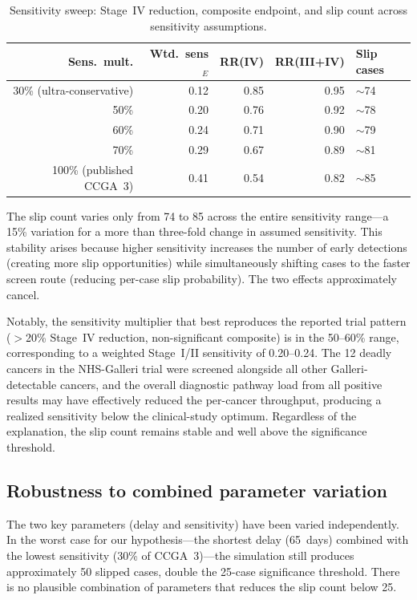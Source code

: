 \documentclass[11pt,letter]{article}
\begin{document}
\begin{table}[!ht]\centering
\caption{Sensitivity sweep: Stage~IV reduction, composite endpoint, and
slip count across sensitivity assumptions.}
\label{tab:sens_sweep}
\begin{tabular}{rrrrl}\toprule
Sens.\ mult. & Wtd.\ sens$_E$ & RR(IV) & RR(III+IV) & Slip cases \\ \midrule
30\% (ultra-conservative) & 0.12 & 0.85 & 0.95 & ${\sim}$74 \\
50\% & 0.20 & 0.76 & 0.92 & ${\sim}$78 \\
60\% & 0.24 & 0.71 & 0.90 & ${\sim}$79 \\
70\% & 0.29 & 0.67 & 0.89 & ${\sim}$81 \\
100\% (published CCGA~3) & 0.41 & 0.54 & 0.82 & ${\sim}$85 \\
\bottomrule
\end{tabular}
\end{table}

\noindent The slip count varies only from 74 to 85 across the entire
sensitivity range---a 15\% variation for a more than three-fold change in
assumed sensitivity. This stability arises because higher sensitivity
increases the number of early detections (creating more slip opportunities)
while simultaneously shifting cases to the faster screen route (reducing
per-case slip probability). The two effects approximately cancel.

Notably, the sensitivity multiplier that best reproduces the reported
trial pattern ($>$20\% Stage~IV reduction, non-significant composite) is
in the 50--60\% range, corresponding to a weighted Stage~I/II sensitivity
of 0.20--0.24. The 12 deadly cancers in the NHS-Galleri trial were screened
alongside all other Galleri-detectable cancers, and the overall diagnostic
pathway load from all positive results may have effectively reduced the
per-cancer throughput, producing a realized sensitivity below the
clinical-study optimum. Regardless of the explanation, the slip count
remains stable and well above the significance threshold.


\subsection{Robustness to combined parameter variation}

The two key parameters (delay and sensitivity) have been varied
independently. In the worst case for our hypothesis---the shortest delay
(65~days) combined with the lowest sensitivity (30\% of CCGA~3)---the
simulation still produces approximately 50 slipped cases, double the
25-case significance threshold. There is no plausible combination of
parameters that reduces the slip count below 25.
\end{document}
